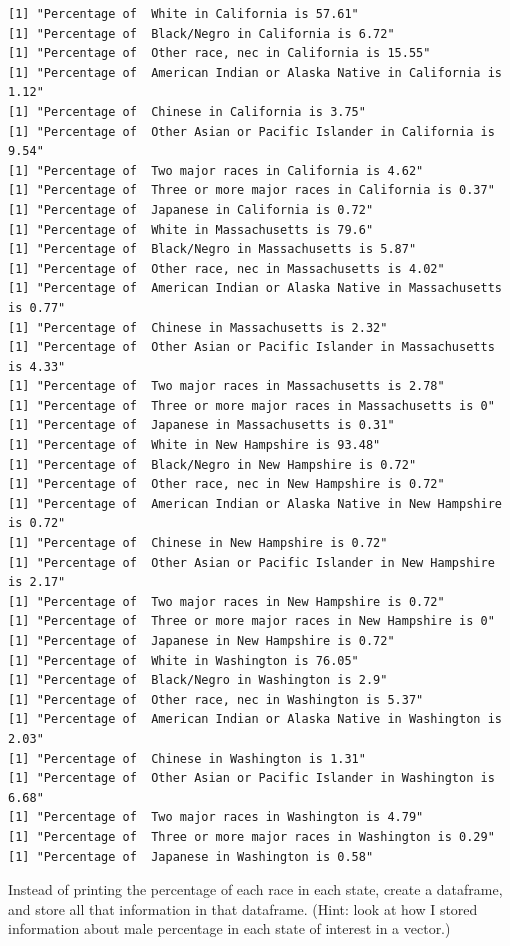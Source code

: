 \documentclass[
  letterpaper,
]{book}
\theoremstyle{definition}
\theoremstyle{definition}
\theoremstyle{plain}
\theoremstyle{definition}
\theoremstyle{plain}
\theoremstyle{plain}
\theoremstyle{remark}
\begin{document}
\begin{verbatim}
[1] "Percentage of  White in California is 57.61"
[1] "Percentage of  Black/Negro in California is 6.72"
[1] "Percentage of  Other race, nec in California is 15.55"
[1] "Percentage of  American Indian or Alaska Native in California is 1.12"
[1] "Percentage of  Chinese in California is 3.75"
[1] "Percentage of  Other Asian or Pacific Islander in California is 9.54"
[1] "Percentage of  Two major races in California is 4.62"
[1] "Percentage of  Three or more major races in California is 0.37"
[1] "Percentage of  Japanese in California is 0.72"
[1] "Percentage of  White in Massachusetts is 79.6"
[1] "Percentage of  Black/Negro in Massachusetts is 5.87"
[1] "Percentage of  Other race, nec in Massachusetts is 4.02"
[1] "Percentage of  American Indian or Alaska Native in Massachusetts is 0.77"
[1] "Percentage of  Chinese in Massachusetts is 2.32"
[1] "Percentage of  Other Asian or Pacific Islander in Massachusetts is 4.33"
[1] "Percentage of  Two major races in Massachusetts is 2.78"
[1] "Percentage of  Three or more major races in Massachusetts is 0"
[1] "Percentage of  Japanese in Massachusetts is 0.31"
[1] "Percentage of  White in New Hampshire is 93.48"
[1] "Percentage of  Black/Negro in New Hampshire is 0.72"
[1] "Percentage of  Other race, nec in New Hampshire is 0.72"
[1] "Percentage of  American Indian or Alaska Native in New Hampshire is 0.72"
[1] "Percentage of  Chinese in New Hampshire is 0.72"
[1] "Percentage of  Other Asian or Pacific Islander in New Hampshire is 2.17"
[1] "Percentage of  Two major races in New Hampshire is 0.72"
[1] "Percentage of  Three or more major races in New Hampshire is 0"
[1] "Percentage of  Japanese in New Hampshire is 0.72"
[1] "Percentage of  White in Washington is 76.05"
[1] "Percentage of  Black/Negro in Washington is 2.9"
[1] "Percentage of  Other race, nec in Washington is 5.37"
[1] "Percentage of  American Indian or Alaska Native in Washington is 2.03"
[1] "Percentage of  Chinese in Washington is 1.31"
[1] "Percentage of  Other Asian or Pacific Islander in Washington is 6.68"
[1] "Percentage of  Two major races in Washington is 4.79"
[1] "Percentage of  Three or more major races in Washington is 0.29"
[1] "Percentage of  Japanese in Washington is 0.58"
\end{verbatim}

Instead of printing the percentage of each race in each state, create a
dataframe, and store all that information in that dataframe. (Hint: look
at how I stored information about male percentage in each state of
interest in a vector.)
\end{document}
